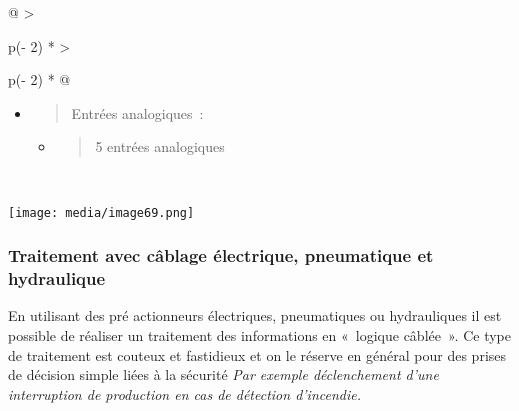 \documentclass[
]{article}
\begin{document}
\begin{longtable}[]{@{}
  >{\raggedright\arraybackslash}p{(\columnwidth - 2\tabcolsep) * }
  >{\raggedright\arraybackslash}p{(\columnwidth - 2\tabcolsep) * }@{}}
\begin{minipage}[t]{\linewidth}
\begin{itemize}
  \begin{itemize}
  \item
    \begin{quote}
    Alimentation par le port USB~: 5V, 500mA
    \end{quote}
  \item
    \begin{quote}
    Alimentation externe en 7 à 12 V (2,1 mm)
    \end{quote}
  \item
    \begin{quote}
    Reprise de l'alimentation externe
    \end{quote}
  \item
    \begin{quote}
    Alimentation externe régulée en 5V/500mA et 3,3 V/50mA.
    \end{quote}
  \end{itemize}
\item
  \begin{quote}
  Entrées analogiques~:
  \end{quote}

  \begin{itemize}
  \item
    \begin{quote}
    5 entrées analogiques
    \end{quote}
  \end{itemize}
\end{itemize}
\end{minipage} \\
\bottomrule
\end{longtable}

\texttt{[image: media/image69.png]}

\hypertarget{traitement-avec-cuxe2blage-uxe9lectrique-pneumatique-et-hydraulique}{%
\subsubsection{Traitement avec câblage électrique, pneumatique et
hydraulique}\label{traitement-avec-cuxe2blage-uxe9lectrique-pneumatique-et-hydraulique}}

En utilisant des pré actionneurs électriques, pneumatiques ou
hydrauliques il est possible de réaliser un traitement des informations
en «~logique câblée~». Ce type de traitement est couteux et fastidieux
et on le réserve en général pour des prises de décision simple liées à
la sécurité \emph{Par exemple déclenchement d'une interruption de
production en cas de détection d'incendie.}
\end{document}
